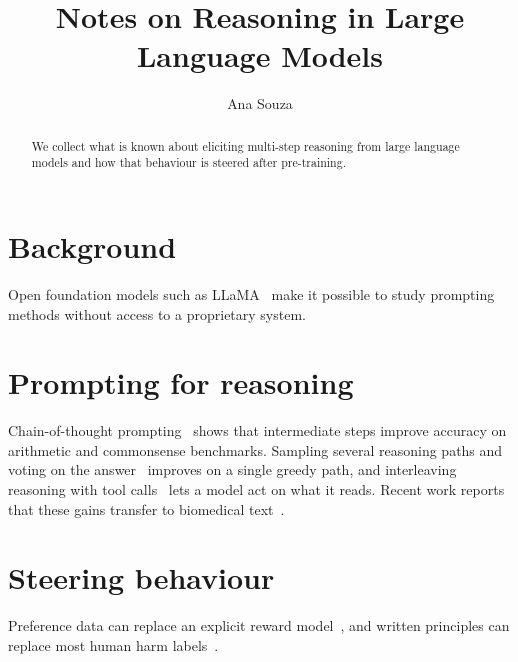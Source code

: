 \documentclass{article}
\title{Notes on Reasoning in Large Language Models}
\author{Ana Souza}
\date{}
\begin{document}
\maketitle

\begin{abstract}
We collect what is known about eliciting multi-step reasoning from large language models
and how that behaviour is steered after pre-training.
\end{abstract}

\section{Background}
Open foundation models such as LLaMA~\cite{touvron2023llama} make it possible to study
prompting methods without access to a proprietary system.

\section{Prompting for reasoning}
Chain-of-thought prompting~\cite{wei2022chainofthought} shows that intermediate steps
improve accuracy on arithmetic and commonsense benchmarks. Sampling several reasoning paths
and voting on the answer~\cite{wang2022selfconsitency} improves on a single greedy path, and
interleaving reasoning with tool calls~\cite{yao2022react} lets a model act on what it reads.
Recent work reports that these gains transfer to biomedical text~\cite{chen2023benchmarking}.

\section{Steering behaviour}
Preference data can replace an explicit reward model~\cite{rafailov2023direct}, and written
principles can replace most human harm labels~\cite{bai2022constitutional}.



\end{document}
